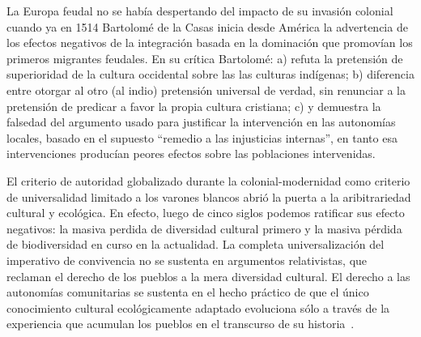 \documentclass[a4paper,10pt]{book}
\begin{document}

La Europa feudal no se había despertando del impacto de su invasión colonial cuando ya en 1514 Bartolomé de la Casas inicia desde América la advertencia de los efectos negativos de la integración basada en la dominación que promovían los primeros migrantes feudales.
En su crítica Bartolomé:
a) refuta la pretensión de superioridad de la cultura occidental sobre las las culturas indígenas;
b) diferencia entre otorgar al otro (al indio) pretensión universal de verdad, sin renunciar a la pretensión de predicar a favor la propia cultura cristiana;
c) y demuestra la falsedad del argumento usado para justificar la intervención en las autonomías locales, basado en el supuesto ``remedio a las injusticias internas'', en tanto esa intervenciones producían peores efectos sobre las poblaciones intervenidas.


El criterio de autoridad globalizado durante la colonial-modernidad como criterio de universalidad limitado a los varones blancos abrió la puerta a la aribitrariedad cultural y ecológica.
En efecto, luego de cinco siglos podemos ratificar sus efecto negativos: la masiva perdida de diversidad cultural primero y la masiva pérdida de biodiversidad en curso en la actualidad.
La completa universalización del imperativo de convivencia no se sustenta en argumentos relativistas, que reclaman el derecho de los pueblos a la mera diversidad cultural.
El derecho a las autonomías comunitarias se sustenta en el hecho práctico de que el único conocimiento cultural ecológicamente adaptado evoluciona sólo a través de la experiencia que acumulan los pueblos en el transcurso de su historia~\cite{Rita}.
\end{document}
